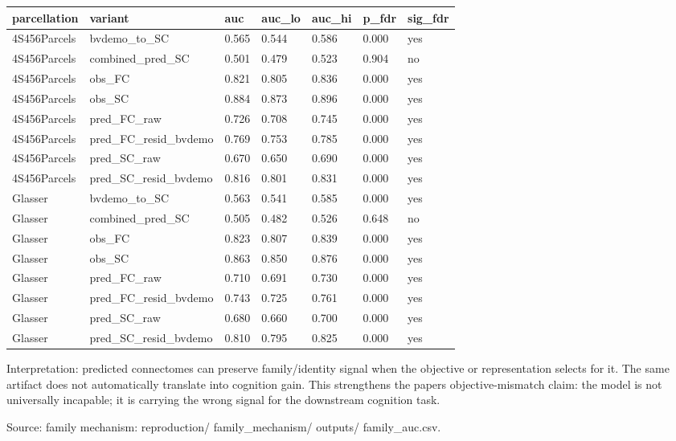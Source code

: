 {\def\LTcaptype{none} %
\begin{longtable}[]{@{}lllllll@{}}
\toprule\noalign{}
parcellation & variant & auc & auc\_lo & auc\_hi & p\_fdr & sig\_fdr \\
\midrule\noalign{}
\endhead
\bottomrule\noalign{}
\endlastfoot
4S456Parcels & bvdemo\_to\_SC & 0.565 & 0.544 & 0.586 & 0.000 & yes \\
4S456Parcels & combined\_pred\_SC & 0.501 & 0.479 & 0.523 & 0.904 & no \\
4S456Parcels & obs\_FC & 0.821 & 0.805 & 0.836 & 0.000 & yes \\
4S456Parcels & obs\_SC & 0.884 & 0.873 & 0.896 & 0.000 & yes \\
4S456Parcels & pred\_FC\_raw & 0.726 & 0.708 & 0.745 & 0.000 & yes \\
4S456Parcels & pred\_FC\_resid\_bvdemo & 0.769 & 0.753 & 0.785 & 0.000 & yes \\
4S456Parcels & pred\_SC\_raw & 0.670 & 0.650 & 0.690 & 0.000 & yes \\
4S456Parcels & pred\_SC\_resid\_bvdemo & 0.816 & 0.801 & 0.831 & 0.000 & yes \\
Glasser & bvdemo\_to\_SC & 0.563 & 0.541 & 0.585 & 0.000 & yes \\
Glasser & combined\_pred\_SC & 0.505 & 0.482 & 0.526 & 0.648 & no \\
Glasser & obs\_FC & 0.823 & 0.807 & 0.839 & 0.000 & yes \\
Glasser & obs\_SC & 0.863 & 0.850 & 0.876 & 0.000 & yes \\
Glasser & pred\_FC\_raw & 0.710 & 0.691 & 0.730 & 0.000 & yes \\
Glasser & pred\_FC\_resid\_bvdemo & 0.743 & 0.725 & 0.761 & 0.000 & yes \\
Glasser & pred\_SC\_raw & 0.680 & 0.660 & 0.700 & 0.000 & yes \\
Glasser & pred\_SC\_resid\_bvdemo & 0.810 & 0.795 & 0.825 & 0.000 & yes \\
\end{longtable}
}

Interpretation: predicted connectomes can preserve family/identity signal when the objective or representation selects for it. The same artifact does not automatically translate into cognition gain. This strengthens the paper\textquotesingle s objective-mismatch claim: the model is not universally incapable; it is carrying the wrong signal for the downstream cognition task.

Source: family mechanism: reproduction/ family\_mechanism/ outputs/ family\_auc.csv.

